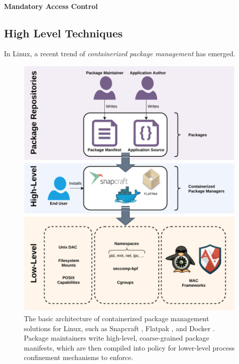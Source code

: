 \documentclass[dvipsnames, 12pt]{article}
\begin{document}
\paragraph*{Mandatory Access Control}


\subsection{High Level Techniques}
\label{sec:high-level}

In Linux, a recent trend of \textit{containerized package management} has emerged.

\begin{figure}[htpb]
    \centering
    \includegraphics[width=0.8\linewidth]{figs/high-level.pdf}
    \caption{
        The basic architecture of containerized package management solutions for
        Linux, such as Snapcraft \cite{snap}, Flatpak \cite{flatpak}, and Docker
        \cite{docker}. Package maintainers write high-level, coarse-grained
        package manifests, which are then compiled into policy for lower-level
        process confinement mechanisms to enforce.
    }%
    \label{fig:containerized}
\end{figure}

\end{document}
